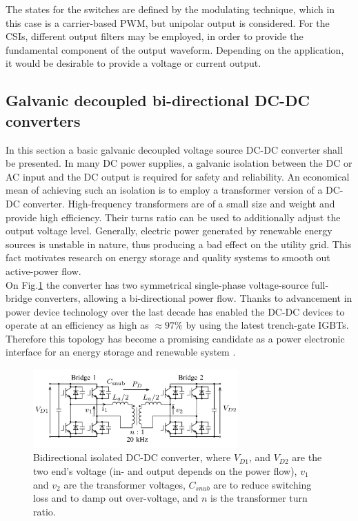 The states for the switches are defined by the modulating technique, which in this case is a carrier-based PWM, but unipolar output is considered. For the CSIs, different output filters may be employed, in order to provide the fundamental component of the output waveform. Depending on the application, it would be desirable to provide a voltage or current output.

\subsection{Galvanic decoupled bi-directional DC-DC converters}\label{BASICCSR:sec:DCDC}

In this section a basic galvanic decoupled voltage source DC-DC converter shall be presented. In many DC power supplies, a galvanic isolation between the DC or AC input and the DC output is required for safety and reliability. An economical mean of achieving such an isolation is to employ a transformer version of a DC-DC converter. High-frequency transformers are of a small size and weight and provide high efficiency. Their turns ratio can be used to additionally adjust the output voltage level. Generally, electric power generated by renewable energy sources is unstable in nature, thus producing a bad effect on the utility grid. This fact motivates research on energy storage and quality systems to smooth out active-power flow.\\
On Fig.\ref{BASICCSR:fig:DCDCGalvanic} the converter has two symmetrical single-phase voltage-source full-bridge converters, allowing a bi-directional power flow. Thanks to advancement in power device technology over the last decade has enabled the DC-DC devices to operate at an efficiency as high as $\approx97\%$ by using the latest trench-gate IGBTs. Therefore this topology has become a promising candidate as a power electronic interface for an energy storage and renewable system \cite{kheraluwala1992performance} \cite{inoue2007bidirectional}.


\begin{figure}[!ht]
        \centering
        \includegraphics[width=0.7\textwidth]{EMPC_PNG_Pics/DC_DC_galvanic.png}
        \caption{Bidirectional isolated DC-DC converter, where $V_{D1}$, and $V_{D2}$ are the two end's voltage (in- and output depends on the power flow), $v_1$ and $v_2$ are the transformer voltages, $C_{snub}$ are to reduce switching loss and to damp out
over-voltage, and $n$ is the transformer turn ratio.}
        \label{BASICCSR:fig:DCDCGalvanic}
    \end{figure}
		
